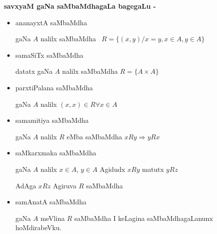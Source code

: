 \bigskip

\begin{center}
{\large\bf savxyaM gaNa saMbaMdhagaLa bagegaLu - }
\end{center}

\begin{itemize}
\item[\eng{(1)}] ananayxtA saMbaMdha \ 

gaNa $A$ nalilx saMbaMdha \ $R=\{(x,y)/x=y, x\in A, y\in A\}$

\item[\eng{(2)}] samaSiTx saMbaMdha \ 

datatx gaNa $A$ nalilx saMbaMdha $R=\{A\times A\}$

\item[\eng{(3)}] parxtiPalana saMbaMdha \ 

gaNa $A$ nalilx $(x,x)\in R\forall x\in A$

\item[\eng{(4)}] samamitiya saMbaMdha \ 

gaNa $A$ nalilx $R$ eMba saMbaMdha $xRy\Rightarrow yRx$

\item[\eng{(5)}] saMkarxmaka saMbaMdha \ 

gaNa $A$ nalilx $x\in A$, $y\in A$ Agidudx $xRy$ matutx $yRz$

AdAga $xRz$ Agiruva $R$ saMbaMdha

\item[\eng{(6)}] samAnatA saMbaMdha \ 

gaNa $A$ meVlina $R$ saMbaMdha I keLagina saMbaMdhagaLanunx hoMdirabeVku.
\end{itemize}

